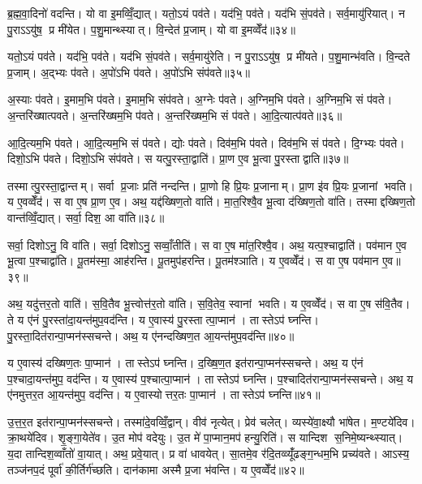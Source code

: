 ब्र॒ह्म॒वा॒दिनो॑ वदन्ति। यो वा इ॒मव्विँ॒द्यात्। यतो॒ऽयं पव॑ते। यद॑भि॒ पव॑ते। यद॑भि सं॒पव॑ते। सर्व॒मायु॑रियात्। न पु॒राऽऽयु॑ष॒ प्र मी॑येत। प॒शु॒मान्थ्स्यात्। वि॒न्देत॑ प्र॒जाम्। यो वा इ॒मव्वेँद॑॥३४॥

यतो॒ऽयं पव॑ते। यद॑भि॒ पव॑ते। यद॑भि सं॒पव॑ते। सर्व॒मायु॑रेति। न पु॒राऽऽयु॑ष॒ प्र मी॑यते। प॒शु॒मान्भ॑वति। वि॒न्दते प्र॒जाम्। अ॒द्भ्यः प॑वते। अ॒पो॑ऽभि प॑वते। अ॒पो॑ऽभि संप॑वते॥३५॥

अ॒स्याः प॑वते। इ॒माम॒भि प॑वते। इ॒माम॒भि संप॑वते। अ॒ग्नेः प॑वते। अ॒ग्निम॒भि प॑वते। अ॒ग्निम॒भि सं प॑वते। अ॒न्तरि॑ख्षात्पवते। अ॒न्तरि॑ख्षम॒भि प॑वते। अ॒न्तरि॑ख्षम॒भि सं प॑वते। आ॒दि॒त्यात्प॑वते॥३६॥

आ॒दि॒त्यम॒भि प॑वते। आ॒दि॒त्यम॒भि सं प॑वते। द्योः प॑वते। दिव॑म॒भि प॑वते। दिव॑म॒भि सं प॑वते। दि॒ग्भ्यः प॑वते। दिशो॒ऽभि प॑वते। दिशो॒ऽभि संप॑वते। स यत्पु॒रस्ता॒द्वाति॑। प्रा॒ण ए॒व भू॒त्वा पु॒रस्ताद्वाति॥३७॥

तस्मात्पु॒रस्ता॒द्वान्तम्। सर्वा प्र॒जाः प्रति॑ नन्दन्ति। प्रा॒णो हि प्रि॒यः प्र॒जानाम्। प्रा॒ण इ॑व प्रि॒यः प्र॒जानां भवति। य ए॒वव्वेँद॑। स वा ए॒ष प्रा॒ण ए॒व। अथ॒ यद्द॑ख्षिण॒तो वाति॑। मा॒त॒रिश्वै॒व भू॒त्वा द॑ख्षिण॒तो वा॑ति। तस्माद्दख्षिण॒तो वान्त॑व्विँ॒द्यात्। सर्वा॒ दिश॒ आ वा॑ति॥३८॥

सर्वा॒ दिशोऽनु॒ वि वा॑ति। सर्वा॒ दिशोऽनु॒ सव्वाँ॒तीति॑। स वा ए॒ष मा॑त॒रिश्वै॒व। अथ॒ यत्प॒श्चाद्वाति॑। पव॑मान ए॒व भू॒त्वा प॒श्चाद्वा॑ति। पू॒तम॑स्मा॒ आह॑रन्ति। पू॒तमुप॑हरन्ति। पू॒तम॑श्ञाति। य ए॒वव्वेँद॑। स वा ए॒ष पव॑मान ए॒व॥३९॥

अथ॒ यदु॑त्तर॒तो वाति॑। स॒वि॒तैव भू॒त्त्वोत्त॑र॒तो वा॑ति। स॒वि॒तेव॒ स्वानां भवति। य ए॒वव्वेँद॑। स वा ए॒ष स॑वि॒तैव। ते य ए॑नं पु॒रस्ता॑दा॒यन्त॑मुप॒वद॑न्ति। य ए॒वास्य॑ पु॒रस्तात्पा॒प्मान॑। तास्तेऽप॑ घ्नन्ति। पु॒रस्ता॒दित॑रान्पा॒प्मन॑स्सचन्ते। अथ॒ य ए॑नन्दख्षिण॒त आ॒यन्त॑मुप॒वद॑न्ति॥४०॥

य ए॒वास्य॑ दख्षिण॒तः पा॒प्मान॑। तास्तेऽप॑ घ्नन्ति। द॒ख्षि॒ण॒त इत॑रान्पा॒प्मन॑स्सचन्ते। अथ॒ य ए॑नं प॒श्चादा॒यन्त॑मुप॒ वद॑न्ति। य ए॒वास्य॑ प॒श्चात्पा॒प्मान॑। तास्तेऽप॑ घ्नन्ति। प॒श्चादित॑रान्पा॒प्मन॑स्सचन्ते। अथ॒ य ए॑नमुत्तर॒त आ॒यन्त॑मुप॒ वद॑न्ति। य ए॒वास्योत्तर॒तः पा॒प्मान॑। तास्तेऽप॑ घ्नन्ति॥४१॥

उ॒त्त॒र॒त इत॑रान्पा॒प्मन॑स्सचन्ते। तस्मा॑दे॒वव्विँ॒द्वान्। वीव॑ नृत्येत्। प्रेव॑ चलेत्। व्यस्ये॑वा॒क्ष्यौ भा॑षेत। म॒ण्टये॑दिव। क्रा॒थये॑दिव। शृ॒ङ्गा॒येते॑व। उ॒त मोप॑ वदेयुः। उ॒त मे॑ पा॒प्मान॒मप॑ हन्यु॒रिति॑। स यान्दिश स॒निमे॒ष्यन्थ्स्यात्। य॒दा तान्दिश॒व्वाँतो॑ वा॒यात्। अथ॒ प्रवे॒यात्। प्र वा॑ धावयेत्। सा॒तमे॒व र॑दि॒तव्व्यूँ॑ढङ्ग॒न्धम॒भि प्रच्य॑वते। आऽस्य॒ तञ्ज॑नप॒दं पूर्वा॑ की॒र्तिर्ग॑च्छति। दान॑कामा अस्मै प्र॒जा भ॑वन्ति। य ए॒वव्वेँद॑॥४२॥\anuvakamend[वेद॒ सं प॑वत आदि॒त्यात्प॑वते वा॒त्या वात्ये॒ष पव॑मान ए॒व द॑ख्षिण॒त आ॒यन्त॑मुप॒ वद॑न्त्युत्तर॒तः पा॒प्मान॒स्ता स्तेप॑ घ्न॒न्तीत्य॒ष्टौ च॑]

